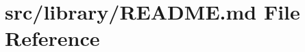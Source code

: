 \hypertarget{src_2library_2README_8md}{}\section{src/library/\+R\+E\+A\+D\+ME.md File Reference}
\label{src_2library_2README_8md}

